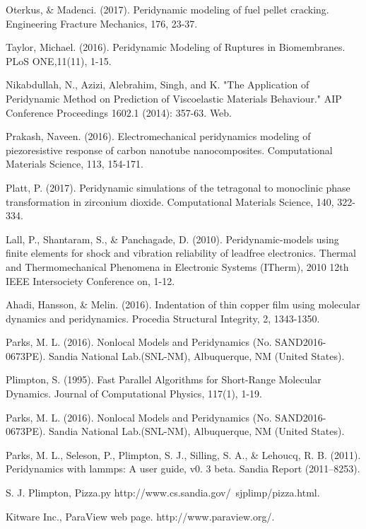 \begin{thebibliography}{}
Oterkus, \& Madenci. (2017). Peridynamic modeling of fuel pellet cracking. Engineering Fracture Mechanics, 176, 23-37.

Taylor, Michael. (2016). Peridynamic Modeling of Ruptures in Biomembranes. PLoS ONE,11(11), 1-15.

Nikabdullah, N., Azizi, Alebrahim, Singh, and K. "The Application of Peridynamic Method on Prediction of Viscoelastic Materials Behaviour." AIP Conference Proceedings 1602.1 (2014): 357-63. Web.

Prakash, Naveen. (2016). Electromechanical peridynamics modeling of piezoresistive response of carbon nanotube nanocomposites. Computational Materials Science, 113, 154-171.

Platt, P. (2017). Peridynamic simulations of the tetragonal to monoclinic phase transformation in zirconium dioxide. Computational Materials Science, 140, 322-334.

Lall, P., Shantaram, S., \& Panchagade, D. (2010). Peridynamic-models using finite elements for shock and vibration reliability of leadfree electronics. Thermal and Thermomechanical Phenomena in Electronic Systems (ITherm), 2010 12th IEEE Intersociety Conference on, 1-12.

Ahadi, Hansson, \& Melin. (2016). Indentation of thin copper film using molecular dynamics and peridynamics. Procedia Structural Integrity, 2, 1343-1350.

Parks, M. L. (2016). Nonlocal Models and Peridynamics (No. SAND2016-0673PE). Sandia National Lab.(SNL-NM), Albuquerque, NM (United States).

Plimpton, S. (1995). Fast Parallel Algorithms for Short-Range Molecular Dynamics. Journal of Computational Physics, 117(1), 1-19.

Parks, M. L. (2016). Nonlocal Models and Peridynamics (No. SAND2016-0673PE). Sandia National Lab.(SNL-NM), Albuquerque, NM (United States).

Parks, M. L., Seleson, P., Plimpton, S. J., Silling, S. A., \& Lehoucq, R. B. (2011). Peridynamics with lammps: A user guide, v0. 3 beta. Sandia Report (2011–8253).

S. J. Plimpton, Pizza.py http://www.cs.sandia.gov/~sjplimp/pizza.html.

Kitware Inc., ParaView web page. http://www.paraview.org/.



\end{thebibliography}
